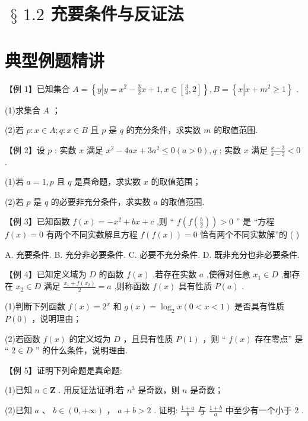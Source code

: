 \section*{$\text{ § }{1.2}$ 充要条件与反证法}

\section*{典型例题精讲}

【例 1】已知集合 $A = \left\{  {y\left| {y = {x}^{2} - \frac{3}{2}x + 1}\right. ,x \in  \left\lbrack  {\frac{3}{4},2}\right\rbrack  }\right\}  ,B = \left\{  {x\left| {x + {m}^{2} \geq  1}\right. }\right\}$ .

(1)求集合 $A$ ；

(2)若 $p : x \in  A;q : x \in  B$ 且 $p$ 是 $q$ 的充分条件，求实数 $m$ 的取值范围.

【例 2】设 $p$ : 实数 $x$ 满足 ${x}^{2} - {4ax} + 3{a}^{2} \leq  0\left( {a > 0}\right) ,q$ : 实数 $x$ 满足 $\frac{x - 3}{x - 2} < 0$ .

(1)若 $a = 1,p$ 且 $q$ 是真命题，求实数 $x$ 的取值范围；

(2)若 $p$ 是 $q$ 的必要非充分条件，求实数 $a$ 的取值范围.

【例 3】已知函数 $f\left( x\right)  =  - {x}^{2} + {bx} + c$ ,则 “ $f\left( {f\left( \frac{b}{2}\right) }\right)  > 0$ ” 是 “方程 $f\left( x\right)  = 0$ 有两个不同实数解且方程 $f\left( {f\left( x\right) }\right)  = 0$ 恰有两个不同实数解”的 ( )

A. 充要条件. B. 充分非必要条件. C. 必要不充分条件. D. 既非充分也非必要条件.

【例 4】已知定义域为 $D$ 的函数 $f\left( x\right)$ ,若存在实数 $a$ ,使得对任意 ${x}_{1} \in  D$ ,都存在 ${x}_{2} \in  D$ 满足 $\frac{{x}_{1} + f\left( {x}_{2}\right) }{2} = a$ ,则称函数 $f\left( x\right)$ 具有性质 $P\left( a\right)$ .

(1)判断下列函数 $f\left( x\right)  = {2}^{x}$ 和 $g\left( x\right)  = {\log }_{2}x\left( {0 < x < 1}\right)$ 是否具有性质 $P\left( 0\right)$ ，说明理由；

(2)若函数 $f\left( x\right)$ 的定义域为 $D$ ，且具有性质 $P\left( 1\right)$ ，则 “ $f\left( x\right)$ 存在零点” 是 “ $2 \in  D$ ” 的什么条件，说明理由.

【例 5】证明下列命题是真命题:

(1)已知 $n \in  \mathbf{Z}$ . 用反证法证明:若 ${n}^{3}$ 是奇数，则 $n$ 是奇数；

(2)已知 $a$ 、 $b \in  \left( {0, + \infty }\right)$ ， $a + b > 2$ . 证明: $\frac{1 + a}{b}$ 与 $\frac{1 + b}{a}$ 中至少有一个小于 2 .

